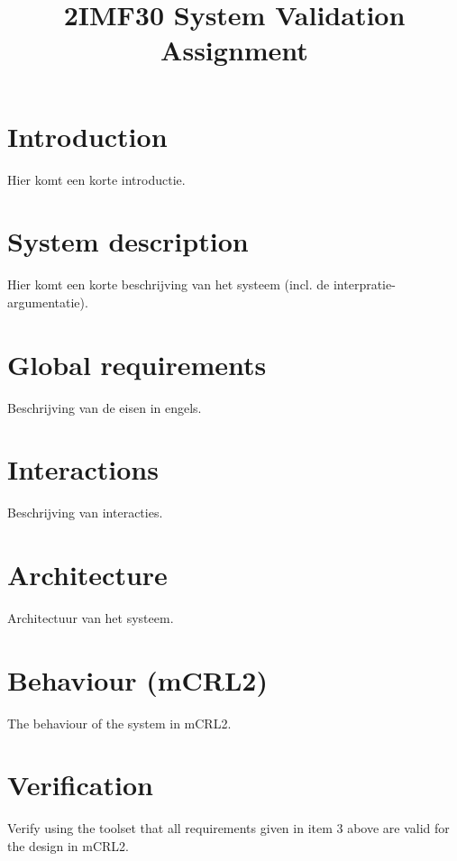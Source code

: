 \documentclass{article}
\title{2IMF30 System Validation Assignment}
\begin{document}
\section{Introduction}
Hier komt een korte introductie.

\section{System description}
Hier komt een korte beschrijving van het systeem (incl. de interpratie-argumentatie).

\section{Global requirements}
Beschrijving van de eisen in engels.

\section{Interactions}
Beschrijving van interacties.

\section{Architecture}
Architectuur van het systeem.

\section{Behaviour (mCRL2)}
The behaviour of the system in mCRL2.

\section{Verification}
Verify using the toolset that all requirements given in item 3 above are valid for the design
in mCRL2.
\end{document}
